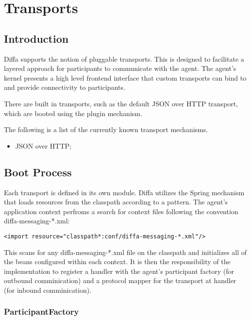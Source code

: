 \chapter{Transports}

\section{Introduction}

Diffa supports the notion of pluggable transports. This is designed to facilitate a layered approach for participants to communicate with the agent. The agent's kernel presents a high level frontend interface that custom transports can bind to and provide connectivity to participants.

There are built in transports, such as the default JSON over HTTP transport, which are booted using the plugin mechanism.

The following is a list of the currently known transport mechanisms.

\begin{itemize}
	\item JSON over HTTP;
\end{itemize}

\section{Boot Process}

Each transport is defined in its own module. Diffa utilizes the Spring mechanism that loads resources from the classpath according to a pattern. The agent's application context perfroms a search for context files following the convention diffa-messaging-*.xml:

\begin{lstlisting}
<import resource="classpath*:conf/diffa-messaging-*.xml"/>
\end{lstlisting}

This scans for any diffa-messaging-*.xml file on the classpath and initializes all of the beans configured within each context. It is then the responsibility of the implementation to register a handler with the agent's participant factory (for outbound comminication) and a protocol mapper for the transport at handler (for inbound comminication).

\subsection{ParticipantFactory}

